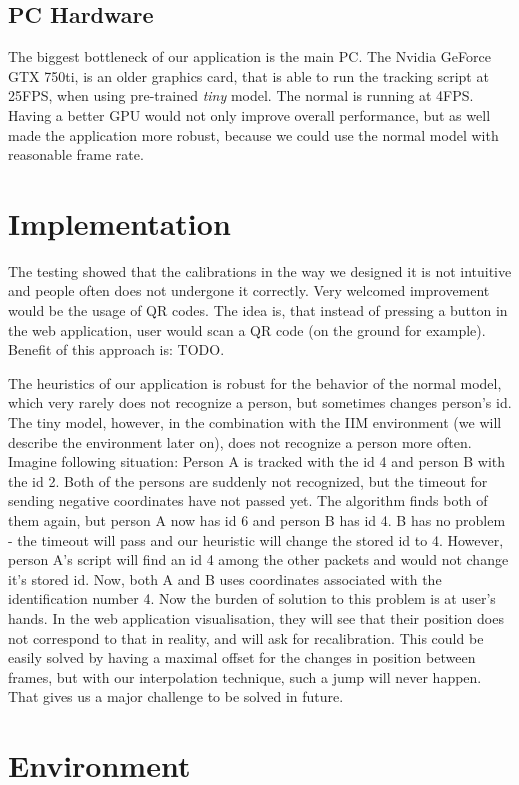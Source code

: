 \documentclass{ctuthesis}
\begin{document}
\subsection{PC Hardware}
The biggest bottleneck of our application is the main PC. The Nvidia GeForce GTX 750ti, is an older graphics card, that is able to run the tracking script at 25FPS, when using pre-trained \textit{tiny} model. The normal is running at 4FPS. Having a better GPU would not only improve overall performance, but as well made the application more robust, because we could use the normal model with reasonable frame rate. 

\section{Implementation}
The testing showed that the calibrations in the way we designed it is not intuitive and people often does not undergone it correctly. Very welcomed improvement would be the usage of QR codes. The idea is, that instead of pressing a button in the web application, user would scan a QR code (on the ground for example). Benefit of this approach is: TODO.

The heuristics of our application is robust for the behavior of the normal model, which very rarely does not recognize a person, but sometimes changes person's id. The tiny model, however, in the combination with the IIM environment (we will describe the environment later on), does not recognize a person more often. Imagine following situation: Person A is tracked with the id 4 and person B with the id 2. Both of the persons are suddenly not recognized, but the timeout for sending negative coordinates have not passed yet. The algorithm finds both of them again, but person A now has id 6 and person B has id 4. B has no problem - the timeout will pass and our heuristic will change the stored id to 4. However, person A's script will find an id 4 among the other packets and would not change it's stored id. Now, both A and B uses coordinates associated with the identification number 4. Now the burden of solution to this problem is at user's hands. In the web application visualisation, they will see that their position does not correspond to that in reality, and will ask for recalibration. This could be easily solved by having a maximal offset for the changes in position between frames, but with our interpolation technique, such a jump will never happen. That gives us a major challenge to be solved in future.

\section{Environment}
\end{document}
